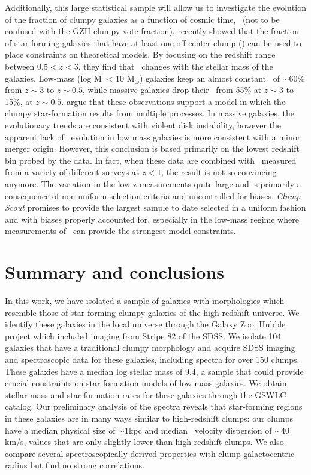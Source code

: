 Additionally, this large statistical sample will allow us to investigate the evolution of the fraction of clumpy galaxies as a function of cosmic time, \fclump~(not to be confused with the GZH clumpy vote fraction). \cite{Guo2015} recently showed that the fraction of star-forming galaxies that have at least one off-center clump (\fclump) can be used to place constraints on theoretical models. By focusing on the redshift range between $0.5 <z<3$, they find that \fclump~changes with the stellar mass of the galaxies. Low-mass (log M $<10$ M$_{\odot}$) galaxies keep an almost constant \fclump~of $\sim$60\% from $z\sim3$ to $z\sim0.5$, while massive galaxies drop their \fclump~from 55\% at $z\sim3$ to 15\%, at $z\sim0.5$. \cite{Guo2015} argue that these observations support a model in which the clumpy star-formation results from multiple processes. In massive galaxies, the evolutionary trends are consistent with violent disk instability, however the apparent lack of \fclump~evolution in low mass galaxies is more consistent with a minor merger origin. However, this conclusion is based primarily on the lowest redshift bin probed by the \cite{Guo2015} data. In fact, when these data are combined with \fclump~measured from a variety of different surveys at $z<1$, the result is not so convincing anymore. The variation in the low-z measurements quite large and is primarily a consequence of non-uniform selection criteria and uncontrolled-for biases. \textit{Clump Scout} promises to provide the largest sample to date selected in a uniform fashion and with biases properly accounted for, especially in the low-mass regime where measurements of \fclump~can provide the strongest model constraints.



\section{Summary and conclusions}\label{chap5: summary}

In this work, we have isolated a sample of galaxies with morphologies which resemble those of star-forming clumpy galaxies of the high-redshift universe. We identify these galaxies in the local universe through the Galaxy Zoo: Hubble project which included imaging from Stripe 82 of the SDSS. We isolate 104 galaxies that have a traditional clumpy morphology and acquire SDSS imaging and spectroscopic data for these galaxies, including spectra for over 150 clumps. These galaxies have a median log stellar mass of 9.4, a sample that could provide crucial constraints on star formation models of low mass galaxies. We obtain stellar mass and star-formation rates for these galaxies through the GSWLC catalog. Our preliminary analysis of the spectra reveals that star-forming regions in these galaxies are in many ways similar to high-redshift clumps: our clumps have a median physical size of $\sim1$kpc and median \ha~velocity dispersion of $\sim40$km/s, values that are only slightly lower than high redshift clumps. We also compare several spectroscopically derived properties with clump galactocentric radius but find no strong correlations. 

